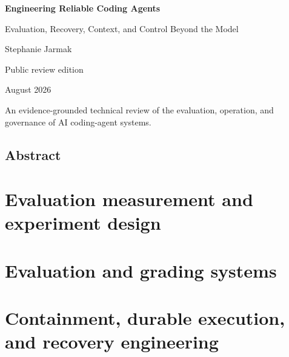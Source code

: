 \documentclass[11pt,oneside]{book}
\begin{document}
\frontmatter

\begin{titlepage}
  \centering
  \vspace*{0.16\textheight}
  {\Huge\bfseries Engineering Reliable Coding Agents\par}
  \vspace{1.2em}
  {\Large Evaluation, Recovery, Context, and Control Beyond the Model\par}
  \vspace{2.5em}
  {\large Stephanie Jarmak\par}
  \vfill
  {\large Public review edition\par}
  {\large August 2026\par}
  \vspace{2em}
  {\normalsize An evidence-grounded technical review of the evaluation, operation, and governance of AI coding-agent systems.\par}
\end{titlepage}

\chapter*{Abstract}


\tableofcontents


\mainmatter
\part{Evaluation measurement and experiment design}







\part{Evaluation and grading systems}







\part{Containment, durable execution, and recovery engineering}
\end{document}
